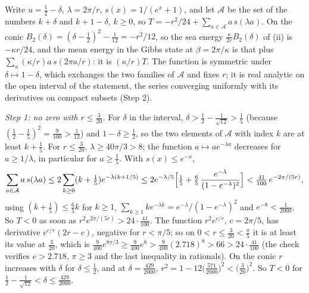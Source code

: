 Write $u = \tfrac12 - \delta$, $\lambda = 2\pi/r$, $s(x) = 1/(e^{x} + 1)$, and let $\mathcal{A}$ be the set of the numbers $k + \delta$ and $k + 1 - \delta$, $k \ge 0$, so $T = -r^{2}/24 + \sum_{a \in \mathcal{A}}a\,s(\lambda a)$. On the conic $B_{2}(\delta) = (\delta - \tfrac12)^{2} - \tfrac{1}{12} = -r^{2}/12$, so the sea energy $\tfrac{\kappa}{2r}B_{2}(\delta)$ of (ii) is $-\kappa r/24$, and the mean energy in the Gibbs state at $\beta = 2\pi/\kappa$ is that plus $\sum_{a}(\kappa/r)a\,s(2\pi a/r)$: it is $(\kappa/r)T$. The function is symmetric under $\delta \mapsto 1 - \delta$, which exchanges the two families of $\mathcal{A}$ and fixes $r$; it is real analytic on the open interval of the statement, the series converging uniformly with its derivatives on compact subsets (Step 2).

\emph{Step 1: no zero with $r \le \tfrac{3}{20}$.} For $\delta$ in the interval, $\delta > \tfrac12 - \tfrac{1}{\sqrt{12}} > \tfrac15$ (because $(\tfrac12 - \tfrac15)^{2} = \tfrac{9}{100} > \tfrac{1}{12}$) and $1 - \delta \ge \tfrac12$, so the two elements of $\mathcal{A}$ with index $k$ are at least $k + \tfrac15$. For $r \le \tfrac{3}{20}$, $\lambda \ge 40\pi/3 > 8$; the function $a \mapsto ae^{-\lambda a}$ decreases for $a \ge 1/\lambda$, in particular for $a \ge \tfrac15$. With $s(x) \le e^{-x}$,
\[
\sum_{a \in \mathcal{A}}a\,s(\lambda a) \le 2\sum_{k \ge 0}(k + \tfrac15)e^{-\lambda(k + 1/5)} \le 2e^{-\lambda/5}\Bigl[\tfrac15 + \tfrac65\,\frac{e^{-\lambda}}{(1 - e^{-\lambda})^{2}}\Bigr] < \tfrac{41}{100}\,e^{-2\pi/(5r)},
\]
using $(k + \tfrac15) \le \tfrac65 k$ for $k \ge 1$, $\sum_{k \ge 1}ke^{-\lambda k} = e^{-\lambda}/(1 - e^{-\lambda})^{2}$ and $e^{-8} < \tfrac{1}{2000}$. So $T < 0$ as soon as $r^{2}e^{2\pi/(5r)} > 24 \cdot \tfrac{41}{100}$. The function $r^{2}e^{c/r}$, $c = 2\pi/5$, has derivative $e^{c/r}(2r - c)$, negative for $r < \pi/5$; so on $0 < r \le \tfrac{3}{20} < \tfrac{\pi}{5}$ it is at least its value at $\tfrac{3}{20}$, which is $\tfrac{9}{400}e^{8\pi/3} \ge \tfrac{9}{400}e^{8} > \tfrac{9}{400}(2.718)^{8} > 66 > 24 \cdot \tfrac{41}{100}$ (the check verifies $e > 2.718$, $\pi \ge 3$ and the last inequality in rationals). On the conic $r$ increases with $\delta$ for $\delta \le \tfrac12$, and at $\delta = \tfrac{429}{2000}$, $r^{2} = 1 - 12\bigl(\tfrac{571}{2000}\bigr)^{2} < \bigl(\tfrac{3}{20}\bigr)^{2}$. So $T < 0$ for $\tfrac12 - \tfrac{1}{\sqrt{12}} < \delta \le \tfrac{429}{2000}$.

